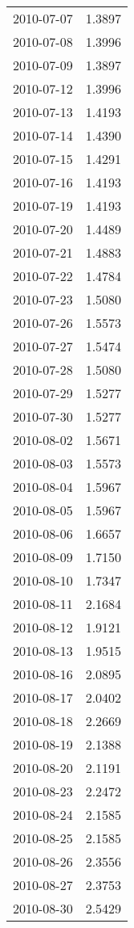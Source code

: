 \begin{tabular}{lr}
2010-07-07 &      1.3897 \\
2010-07-08 &      1.3996 \\
2010-07-09 &      1.3897 \\
2010-07-12 &      1.3996 \\
2010-07-13 &      1.4193 \\
2010-07-14 &      1.4390 \\
2010-07-15 &      1.4291 \\
2010-07-16 &      1.4193 \\
2010-07-19 &      1.4193 \\
2010-07-20 &      1.4489 \\
2010-07-21 &      1.4883 \\
2010-07-22 &      1.4784 \\
2010-07-23 &      1.5080 \\
2010-07-26 &      1.5573 \\
2010-07-27 &      1.5474 \\
2010-07-28 &      1.5080 \\
2010-07-29 &      1.5277 \\
2010-07-30 &      1.5277 \\
2010-08-02 &      1.5671 \\
2010-08-03 &      1.5573 \\
2010-08-04 &      1.5967 \\
2010-08-05 &      1.5967 \\
2010-08-06 &      1.6657 \\
2010-08-09 &      1.7150 \\
2010-08-10 &      1.7347 \\
2010-08-11 &      2.1684 \\
2010-08-12 &      1.9121 \\
2010-08-13 &      1.9515 \\
2010-08-16 &      2.0895 \\
2010-08-17 &      2.0402 \\
2010-08-18 &      2.2669 \\
2010-08-19 &      2.1388 \\
2010-08-20 &      2.1191 \\
2010-08-23 &      2.2472 \\
2010-08-24 &      2.1585 \\
2010-08-25 &      2.1585 \\
2010-08-26 &      2.3556 \\
2010-08-27 &      2.3753 \\
2010-08-30 &      2.5429 \\

\end{tabular}
